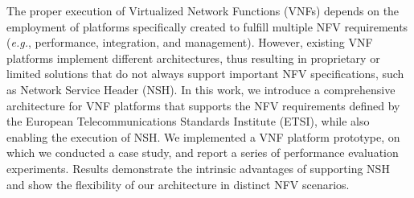 The proper execution of Virtualized Network Functions (VNFs) depends on the employment of platforms specifically created to fulfill multiple NFV requirements (\textit{e.g.}, performance, integration, and management). However, existing VNF platforms implement different architectures, thus resulting in proprietary or limited solutions that do not always support important NFV specifications, such as Network Service Header (NSH). In this work, we introduce a comprehensive architecture for VNF platforms that supports the NFV requirements defined by the European Telecommunications Standards Institute (ETSI), while also enabling the execution of NSH. We implemented a VNF platform prototype, on which we conducted a case study, and report a series of performance evaluation experiments. Results demonstrate the intrinsic advantages of supporting NSH and show the flexibility of our architecture in distinct NFV scenarios.
